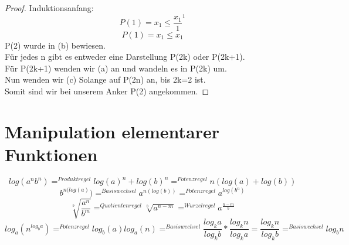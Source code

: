 \documentclass[10pt,ngerman]{article}
\begin{document}
	\subsection{}
	\begin{proof}
		Induktionsanfang: \[ P(1)=x_1 \leq \frac{x_1}{1}^1\]
		\[P(1)=x_1 \leq x_1 \]
		P(2) wurde in (b) bewiesen.\\
		Für jedes n gibt es entweder eine Darstellung P(2k) oder P(2k+1).\\
		Für P(2k+1) wenden wir (a) an und wandeln es in P(2k) um.\\
		Nun wenden wir (c) Solange auf P(2n) an, bis 2k=2 ist.\\
		Somit sind wir bei unserem Anker P(2) angekommen.
		\end{proof}
	\section{Manipulation elementarer Funktionen}
	\[log(a^nb^n)=^{Produktregel}log(a)^n+log(b)^n=^{Potenzregel}n(log(a)+log(b))\]
	\[b^{n(log(a)})=^{Basiswechsel}a^{n(log(b))}=^{Potenzregel}a^{log(b^n)}\]
	\[\sqrt[b]{\frac{a^n}{b^m}}=^{Quotientenregel}\sqrt[b]{a^{n-m}}=^{Wurzelregel}a^{\frac{n-m}{b}}\]
	\[log_a(n^{log_ba})=^{Potenzregel}log_b(a)log_a(n)=^{Basiswechsel}\frac{log_ka}{log_kb}*\frac{log_kn}{log_ka}=\frac{log_kn}{log_kb}=^{Basiswechsel}log_bn\]
		
\end{document}
